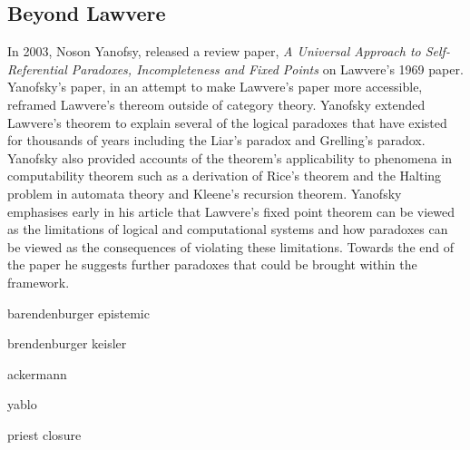 
\subsection{Beyond Lawvere}

In 2003, Noson Yanofsy, released a review paper, \textit{A Universal Approach to
Self-Referential Paradoxes, Incompleteness and Fixed Points} on Lawvere's 1969
paper.  Yanofsky's paper, in an attempt to make Lawvere's paper more accessible,
reframed Lawvere's thereom outside of category theory. Yanofsky extended
Lawvere's theorem to explain several of the logical paradoxes that have existed
for thousands of years including the Liar's paradox and Grelling's paradox.
Yanofsky also provided accounts of the theorem's applicability to phenomena in
computability theorem such as a derivation of Rice's theorem  and the Halting
problem in automata theory and Kleene's recursion theorem. Yanofsky emphasises
early in his article that Lawvere's fixed point theorem can be viewed as the
limitations of logical and computational systems and how paradoxes can be viewed
as the consequences of violating these limitations. Towards the end of the paper
he suggests further paradoxes that could be brought within the framework.

barendenburger epistemic

brendenburger keisler

ackermann

yablo

priest closure



